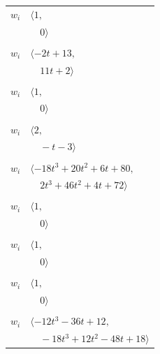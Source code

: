 \documentclass[11pt]{article}
\begin{document}
\begin{longtable}{@{}ll@{}}
$w_i$ & $\langle 1,$\\
 & $\quad 0\rangle$\\
\addlinespace[2pt]
\multicolumn{2}{@{}p{0.97\textwidth}@{}}{$i=86$, $D_i=1$, $\rho_{ij}$: $70{:}1, \allowbreak 78{:}2$}\\
$w_i$ & $\langle -2t+13,$\\
 & $\quad 11t+2\rangle$\\
\addlinespace[2pt]
\multicolumn{2}{@{}p{0.97\textwidth}@{}}{$i=87$, $D_i=1$, $\rho_{ij}$: $--$}\\
$w_i$ & $\langle 1,$\\
 & $\quad 0\rangle$\\
\addlinespace[2pt]
\multicolumn{2}{@{}p{0.97\textwidth}@{}}{$i=88$, $D_i=1$, $\rho_{ij}$: $51{:}2, \allowbreak 77{:}1$}\\
$w_i$ & $\langle 2,$\\
 & $\quad -t-3\rangle$\\
\addlinespace[2pt]
\multicolumn{2}{@{}p{0.97\textwidth}@{}}{$i=89$, $D_i=1$, $\rho_{ij}$: $1{:}2, \allowbreak 4{:}2, \allowbreak 5{:}1, \allowbreak 18{:}1, \allowbreak 27{:}1, \allowbreak 40{:}1, \allowbreak 60{:}2, \allowbreak 61{:}2, \allowbreak 68{:}1, \allowbreak 97{:}1$}\\
$w_i$ & $\langle -18t^{3}+20t^{2}+6t+80,$\\
 & $\quad 2t^{3}+46t^{2}+4t+72\rangle$\\
\addlinespace[2pt]
\multicolumn{2}{@{}p{0.97\textwidth}@{}}{$i=90$, $D_i=1$, $\rho_{ij}$: $--$}\\
$w_i$ & $\langle 1,$\\
 & $\quad 0\rangle$\\
\addlinespace[2pt]
\multicolumn{2}{@{}p{0.97\textwidth}@{}}{$i=91$, $D_i=1$, $\rho_{ij}$: $--$}\\
$w_i$ & $\langle 1,$\\
 & $\quad 0\rangle$\\
\addlinespace[2pt]
\multicolumn{2}{@{}p{0.97\textwidth}@{}}{$i=92$, $D_i=1$, $\rho_{ij}$: $--$}\\
$w_i$ & $\langle 1,$\\
 & $\quad 0\rangle$\\
\addlinespace[2pt]
\multicolumn{2}{@{}p{0.97\textwidth}@{}}{$i=93$, $D_i=1$, $\rho_{ij}$: $1{:}1, \allowbreak 2{:}2, \allowbreak 17{:}2, \allowbreak 27{:}2, \allowbreak 42{:}2, \allowbreak 55{:}2, \allowbreak 65{:}2$}\\
$w_i$ & $\langle -12t^{3}-36t+12,$\\
 & $\quad -18t^{3}+12t^{2}-48t+18\rangle$\\

\end{longtable}
\end{document}
